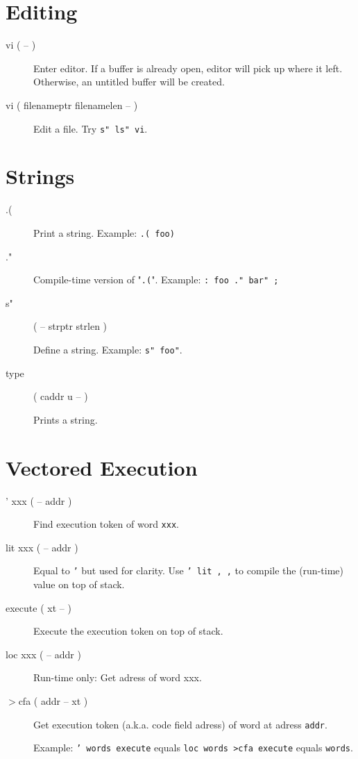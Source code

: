 \section{Editing}

\begin{description}
\item[vi ( -- )]

Enter editor. If a buffer is already open, editor will pick up where it left.
Otherwise, an untitled buffer will be created.

\end{description}

\begin{description}
\item[vi ( filenameptr filenamelen -- )]

Edit a file. Try \texttt{s" ls" vi}.

\end{description}

\section{Strings}

\begin{description}
\item[.(]

Print a string. Example: \texttt{.( foo)}

\item[."]

Compile-time version of "\texttt{.(}". Example: \texttt{: foo ." bar" ;}

\item[s"] ( -- strptr strlen )

Define a string. Example: \texttt{s" foo"}. 

\item[type] ( caddr u -- )

Prints a string.

\end{description}

\section{Vectored Execution}

\begin{description}
\item[' xxx ( -- addr )] Find execution token of word \texttt{xxx}.
\item[lit xxx ( -- addr )] Equal to \texttt{'} but used for clarity. Use \texttt{' lit , ,} to compile the (run-time) value on top of stack.
\item[execute ( xt -- )] Execute the execution token on top of stack.
\item[loc xxx ( -- addr )] Run-time only: Get adress of word xxx.
\item[$>$cfa ( addr -- xt )] Get execution token (a.k.a. code field adress) of word at adress \texttt{addr}.

Example: \texttt{' words execute} equals \texttt{loc words >cfa execute} equals \texttt{words}.
\end{description}


